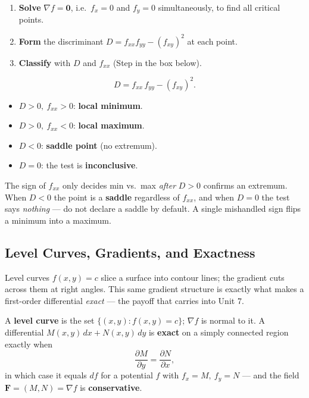 \begin{methodbox}
\begin{enumerate}[leftmargin=1.6em, itemsep=2pt]
    \item \textbf{Solve} $\nabla f=\mathbf 0$, i.e.\ $f_x=0$ and $f_y=0$
          simultaneously, to find all critical points.
    \item \textbf{Form} the discriminant
          $D = f_{xx}f_{yy} - \left(f_{xy}\right)^2$ at each point.
    \item \textbf{Classify} with $D$ and $f_{xx}$ (Step in the box below).
\end{enumerate}
\end{methodbox}

\begin{formulabox}
\[ D = f_{xx}\,f_{yy} - \left(f_{xy}\right)^2. \]
\begin{itemize}[leftmargin=1.4em, itemsep=2pt]
    \item $D>0,\ f_{xx}>0$: \textbf{local minimum}.
    \item $D>0,\ f_{xx}<0$: \textbf{local maximum}.
    \item $D<0$: \textbf{saddle point} (no extremum).
    \item $D=0$: the test is \textbf{inconclusive}.
\end{itemize}
\end{formulabox}

\begin{warningbox}
The sign of $f_{xx}$ only decides min vs.\ max \emph{after} $D>0$ confirms an
extremum. When $D<0$ the point is a \textbf{saddle} regardless of $f_{xx}$, and
when $D=0$ the test says \emph{nothing} --- do not declare a saddle by default.
A single mishandled sign flips a minimum into a maximum.
\end{warningbox}

\subsection{Level Curves, Gradients, and Exactness}

Level curves $f(x,y)=c$ slice a surface into contour lines; the gradient cuts
across them at right angles. This same gradient structure is exactly what makes a
first-order differential \emph{exact} --- the payoff that carries into Unit 7.

\begin{formulabox}
A \textbf{level curve} is the set $\{(x,y):f(x,y)=c\}$; $\nabla f$ is normal to
it. A differential $M(x,y)\,dx+N(x,y)\,dy$ is \textbf{exact} on a simply
connected region exactly when
\[ \frac{\partial M}{\partial y} = \frac{\partial N}{\partial x}, \]
in which case it equals $df$ for a potential $f$ with $f_x=M,\ f_y=N$ --- and the
field $\mathbf F=(M,N)=\nabla f$ is \textbf{conservative}.
\end{formulabox}

